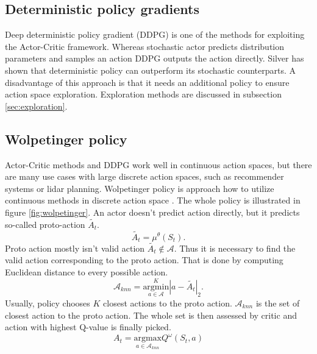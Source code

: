 \subsection{Deterministic policy gradients}
Deep deterministic policy gradient (DDPG) is one of the methods for exploiting the Actor-Critic framework. Whereas stochastic actor predicts distribution parameters and samples an action DDPG outputs the action directly. Silver \cite{silver2014} has shown that deterministic policy can outperform its stochastic counterparts. A disadvantage of this approach is that it needs an additional policy to ensure action space exploration. Exploration methods are discussed in subsection \ref{sec:exploration}.

\subsection{Wolpetinger policy}
Actor-Critic methods and DDPG work well in continuous action spaces, but there are many use cases with large discrete action spaces, such as recommender systems or lidar planning. Wolpetinger policy is approach how to utilize continuous methods in discrete action space \cite{dulac2015}. The whole policy is illustrated in figure \ref{fig:wolpetinger}. An actor doesn't predict action directly, but it predicts so-called proto-action $\tilde{A_t}$.
\begin{equation}
\tilde{A_t} = \mu^\theta(S_t).
\end{equation}
Proto action mostly isn't valid action $\tilde{A_t} \notin \mathcal{A}$. Thus it is necessary to find the valid action corresponding to the proto action. That is done by computing Euclidean distance to every possible action.
\begin{equation} \label{eq:knn}
\mathcal{A}_{knn} = \overset{K}{\underset{a \in \mathcal{A}}{{\text{argmin}}}} | a - \tilde{A_t} |_2 .
\end{equation}
Usually, policy chooses $K$ closest actions to the proto action. $\mathcal{A}_{knn}$ is the set of closest action to the proto action. The whole set is then assessed by critic and action with highest Q-value is finally picked.
\begin{equation}
A_t = \underset{a \in \mathcal{A}_{knn}}{\text{argmax}} Q^\omega(S_t, a)
\end{equation}
